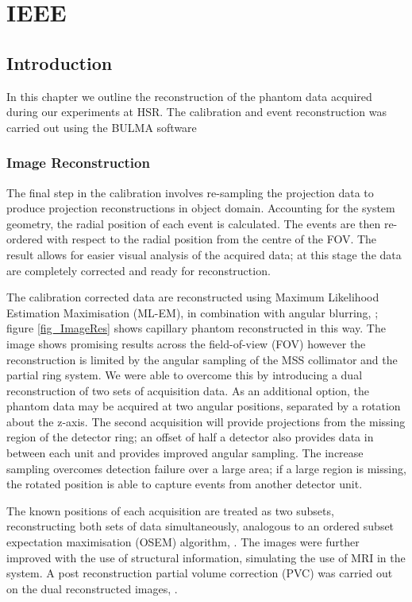 \chapter{IEEE}
\label{IEEE}


\section{Introduction}
In this chapter we outline the reconstruction of the phantom data acquired during our experiments at \acrshort{HSR}. The calibration and event reconstruction was carried out using the BULMA software



 
\subsection{Image Reconstruction}
The final step in the calibration involves re-sampling the projection data to produce projection reconstructions in object domain. Accounting for the system geometry, the radial position of each event is calculated. The events are then re-ordered with respect to the radial position from the centre of the FOV. The result allows for easier visual analysis of the acquired data; at this stage the data are completely corrected and ready for reconstruction. 


The calibration corrected data are reconstructed using Maximum Likelihood Estimation Maximisation (ML-EM), \cite{4307558} in combination with angular blurring, \cite{bousse2013angular}; figure \ref{fig_ImageRes} shows capillary phantom reconstructed in this way. The image shows promising results across the field-of-view (FOV) however the reconstruction is limited by the angular sampling of the MSS collimator and the partial ring system. We were able to overcome this by introducing a dual reconstruction of two sets of acquisition data. As an additional option, the phantom data may be acquired at two angular positions, separated by a rotation about the z-axis. The second acquisition will provide projections from the missing region of the detector ring; an offset of half a detector also provides data in between each unit and provides improved angular sampling. The increase sampling overcomes detection failure over a large area; if a large region is missing, the rotated position is able to capture events from another detector unit. 

The known positions of each acquisition are treated as two subsets, reconstructing both sets of data simultaneously, analogous to an ordered subset expectation maximisation (OSEM) algorithm, \cite{363108}. The images were further improved with the use of structural information, simulating the use of MRI in the system. A post reconstruction partial volume correction (PVC) was carried out on the dual reconstructed images, \cite{Erlandsson_2012}.



